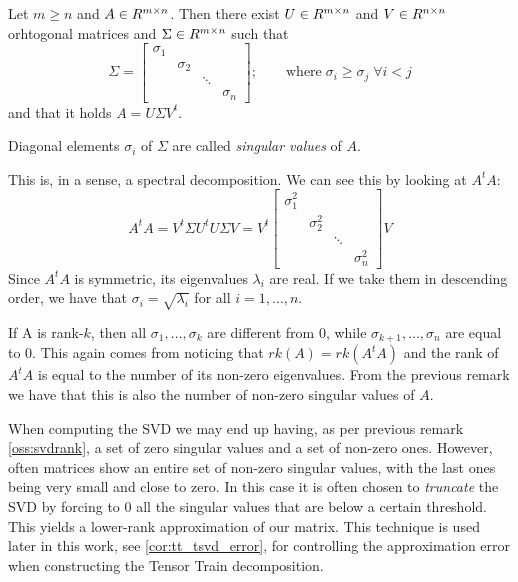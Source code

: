 \begin{Teo} \label{teo:svd}
  Let $m \geq n$ and $A \in R^{m \times n}$. Then there exist $U \in R^{m \times n}$ and $V \in R^{n \times n}$ orhtogonal matrices and $\Sigma \in R^{m \times n}$ such that
  \[
  \Sigma =
  \begin{bmatrix}
    \sigma_1 &&&\\
    & \sigma_2 &&\\
    && \ddots &\\
    &&& \sigma_n
  \end{bmatrix}
  ; \qquad \text{where} \; \sigma_i \geq \sigma_j \; \forall i < j
  \]
  and that it holds $A = U \Sigma V^t$.
\end{Teo}
Diagonal elements $\sigma_i$ of $\Sigma$ are called \emph{singular values} of $A$.
\begin{Oss}
  This is, in a sense, a spectral decomposition. We can see this by looking at $A^t A$:
  \[
  A^t A = V^t \Sigma U^t U \Sigma V = V^t
  \begin{bmatrix}
    \sigma_1^2 &&&\\
    & \sigma_2^2 &&\\
    && \ddots &\\
    &&& \sigma_n^2
  \end{bmatrix}
  V
  \]
  Since $A^t A$ is symmetric, its eigenvalues $\lambda_i$ are real. If we take them in descending order, we have that $\sigma_i = \sqrt{\lambda_i}$ for all $i = 1, \ldots, n$.
\end{Oss}
\begin{Oss} \label{oss:svdrank}
  If A is rank-$k$, then all $\sigma_1, \ldots, \sigma_k$ are different from $0$, while $\sigma_{k+1}, \ldots, \sigma_n$ are equal to $0$. This again comes from noticing that $rk(A) = rk(A^t A)$ and the rank of $A^t A$ is equal to the number of its non-zero eigenvalues. From the previous remark we have that this is also the number of non-zero singular values of $A$.
\end{Oss}

When computing the SVD we may end up having, as per previous remark \eqref{oss:svdrank}, a set of zero singular values and a set of non-zero ones. However, often matrices show an entire set of non-zero singular values, with the last ones being very small and close to zero.
In this case it is often chosen to \emph{truncate} the SVD by forcing to $0$ all the singular values that are below a certain threshold. This yields a lower-rank approximation of our matrix.
This technique is used later in this work, see \eqref{cor:tt_tsvd_error}, for controlling the approximation error when constructing the Tensor Train decomposition.
